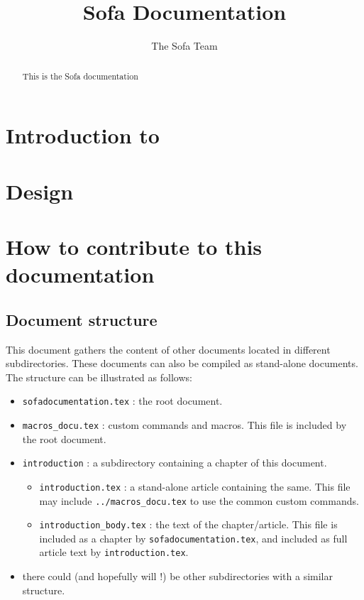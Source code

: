 \documentclass[a4paper,10pt]{report}
\title{Sofa Documentation}
\author{The Sofa Team}
\begin{document}
\maketitle

\begin{abstract}
This is the Sofa documentation
\end{abstract}

\tableofcontents

\chapter{Introduction to \sofa}
\graphicspath{{introduction/}}  %


\chapter{Design}
\graphicspath{{design/}}  %


\chapter{How to contribute to this documentation}
\section{Document structure}
This document gathers the content of other documents located in different subdirectories. These documents can also be compiled as stand-alone documents.
The structure can be illustrated as follows:
\begin{itemize}
 \item \texttt{sofadocumentation.tex} : the root document.
 \item \texttt{macros\_docu.tex} : custom commands and macros. This file is included by the root document.
 \item \texttt{introduction} : a subdirectory containing a chapter of this document.
\begin{itemize}
 \item \texttt{introduction.tex} : a stand-alone article containing the same. This file may include \texttt{../macros\_docu.tex} to use the common custom commands.
 \item \texttt{introduction\_body.tex} : the text of the chapter/article. This file is included as a chapter by \texttt{sofadocumentation.tex}, and included as full article text by \texttt{introduction.tex}.
\end{itemize}
 \item there could (and hopefully will !) be other subdirectories with a similar structure.
\end{itemize}
\end{document}
